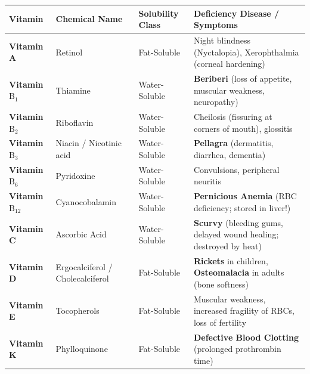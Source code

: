 \documentclass[10pt,a4paper]{article}
\begin{document}
\begin{formulabox}
\begin{tabularx}{\linewidth}{|l|l|Y|L|}
\hline
\textbf{Vitamin} & \textbf{Chemical Name} & \textbf{Solubility Class} & \textbf{Deficiency Disease / Symptoms} \\
\hline
\textbf{Vitamin A} & Retinol & Fat-Soluble & Night blindness (Nyctalopia), Xerophthalmia (corneal hardening) \\
\hline
\textbf{Vitamin $\mathrm{B_1}$} & Thiamine & Water-Soluble & \textbf{Beriberi} (loss of appetite, muscular weakness, neuropathy) \\
\hline
\textbf{Vitamin $\mathrm{B_2}$} & Riboflavin & Water-Soluble & Cheilosis (fissuring at corners of mouth), glossitis \\
\hline
\textbf{Vitamin $\mathrm{B_3}$} & Niacin / Nicotinic acid & Water-Soluble & \textbf{Pellagra} (dermatitis, diarrhea, dementia) \\
\hline
\textbf{Vitamin $\mathrm{B_6}$} & Pyridoxine & Water-Soluble & Convulsions, peripheral neuritis \\
\hline
\textbf{Vitamin $\mathrm{B_{12}}$} & Cyanocobalamin & Water-Soluble & \textbf{Pernicious Anemia} (RBC deficiency; stored in liver!) \\
\hline
\textbf{Vitamin C} & Ascorbic Acid & Water-Soluble & \textbf{Scurvy} (bleeding gums, delayed wound healing; destroyed by heat) \\
\hline
\textbf{Vitamin D} & Ergocalciferol / Cholecalciferol & Fat-Soluble & \textbf{Rickets} in children, \textbf{Osteomalacia} in adults (bone softness) \\
\hline
\textbf{Vitamin E} & Tocopherols & Fat-Soluble & Muscular weakness, increased fragility of RBCs, loss of fertility \\
\hline
\textbf{Vitamin K} & Phylloquinone & Fat-Soluble & \textbf{Defective Blood Clotting} (prolonged prothrombin time) \\
\hline
\end{tabularx}
\end{formulabox}
\end{document}
